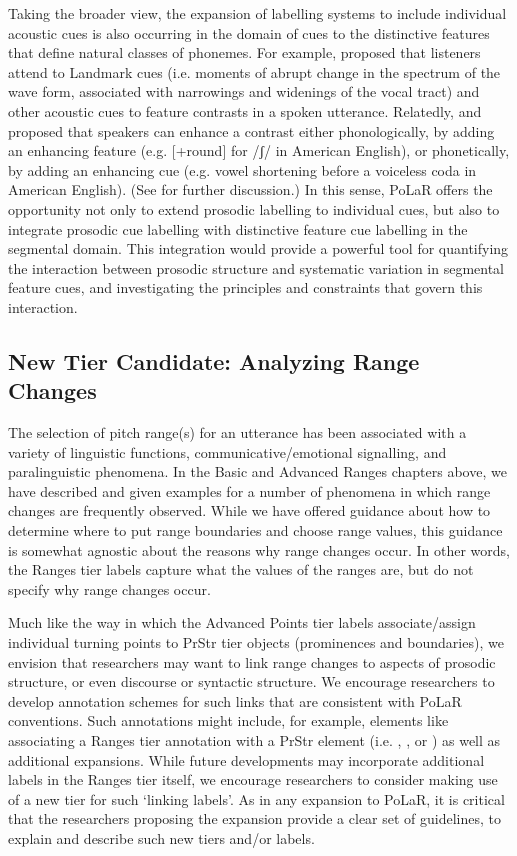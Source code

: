 \documentclass[11pt, twoside]{memoir}
\def\textlabel#1{{\relsize{-.5}\fontspec[Mapping=tex-text]{Roboto Mono}{#1}}}
\def\ipaslashes#1{/{#1}/}
\begin{document}
Taking the broader view,  the expansion of labelling systems to include individual acoustic cues is also occurring in the domain of cues to the distinctive features that define natural classes of phonemes.  For example, \citet{stevens02} proposed that listeners attend to Landmark cues (i.e. moments of abrupt change in the spectrum of the wave form, associated with narrowings and widenings of the vocal tract) and other acoustic cues to feature contrasts in a spoken utterance.  Relatedly, \citet{stevenskeyser89} and \citet{keyserstevens01} proposed that speakers can enhance a contrast either phonologically, by adding an enhancing feature (e.g. [+round] for \ipaslashes{ʃ} in American English), or phonetically, by adding an enhancing cue (e.g. vowel shortening before a voiceless coda in American English).  (See \citealt{clements09} for further discussion.)   In this sense, PoLaR offers the opportunity not only to extend prosodic labelling to individual cues, but also to integrate prosodic cue labelling with distinctive feature cue labelling in the segmental domain.  This integration would provide a powerful tool for quantifying the interaction between prosodic structure and systematic variation in segmental feature cues, and investigating the principles and constraints that govern this interaction.  

\subsection{New Tier Candidate: Analyzing Range Changes}\label{sec:new-tier-range-changes}
The selection of pitch range(s) for an utterance has been associated with a variety of linguistic functions, communicative\slash emotional signalling, and paralinguistic phenomena. In the Basic and Advanced Ranges chapters above, we have described and given examples for a number of phenomena in which range changes are frequently observed.  While we have offered guidance about how to determine where to put range boundaries and choose range values, this guidance is somewhat agnostic about the reasons why range changes occur. In other words, the Ranges tier labels capture what the values of the ranges are, but do not specify why range changes occur. 

Much like the way in which the Advanced Points tier labels associate\slash assign individual turning points to PrStr tier objects (prominences and boundaries), we envision that researchers may want to link range changes to aspects of prosodic structure, or even discourse or syntactic structure. We encourage researchers to develop annotation schemes for such links that are consistent with PoLaR conventions. Such annotations might include, for example, elements like associating a Ranges tier annotation with a PrStr element (i.e. \textlabel{*}, \textlabel{[}, or \textlabel{]}) as well as additional expansions. While future developments may incorporate additional labels in the Ranges tier itself, we encourage researchers to consider making use of a new tier for such ‘linking labels’. As in any expansion to PoLaR, it is critical that the researchers proposing the expansion provide a clear set of guidelines, to explain and describe such new tiers and/or labels.
\end{document}
